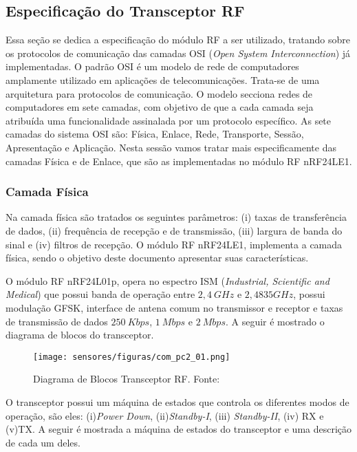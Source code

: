 \subsection{Especificação do Transceptor RF}

Essa seção se dedica a especificação do módulo RF a ser utilizado, tratando sobre os protocolos de comunicação das camadas OSI (\emph{Open System Interconnection}) já implementadas. O padrão OSI  é um modelo de rede de computadores amplamente utilizado em aplicações de telecomunicações. Trata-se de uma arquitetura para protocolos de comunicação. O modelo secciona redes de computadores em sete camadas, com objetivo de que a cada camada seja atribuída uma funcionalidade assinalada por um protocolo específico. As sete camadas do sistema OSI são: Física, Enlace, Rede, Transporte, Sessão, Apresentação e Aplicação. Nesta sessão vamos tratar mais especificamente das camadas Física e de Enlace, que são as implementadas no módulo RF nRF24LE1.

\subsubsection{Camada Física}

Na camada física são tratados os seguintes parâmetros: (i) taxas de transferência de dados, (ii) frequência de recepção e de transmissão, (iii) largura de banda do sinal e (iv) filtros de recepção. O módulo RF nRF24LE1, implementa a camada física, sendo o objetivo deste documento apresentar suas características.

O módulo RF nRF24L01p, opera no espectro ISM (\emph{Industrial, Scientific and Medical}) que possui banda de operação entre $2,4~GHz$ e $2,4835GHz$, possui modulação GFSK, interface de antena comum no transmissor e receptor e taxas de transmissão de dados $250~Kbps$, $1~Mbps$ e $2~Mbps$. A seguir é mostrado o diagrama de blocos do transceptor.

\begin{figure}[H]
\centering
	\label{com_pc2_01}
	\texttt{[image: sensores/figuras/com\_pc2\_01.png]}
   \caption{Diagrama de Blocos Transceptor RF. Fonte: \cite{bib_com_01_yas}}
\end{figure}

O transceptor possui um máquina de estados que controla os diferentes modos de operação, são eles:  (i)\emph{Power Down}, (ii)\emph{Standby-I}, (iii) \emph{Standby-II}, (iv) RX e (v)TX. A seguir é mostrada a máquina de estados do transceptor e uma descrição de cada um deles. 


